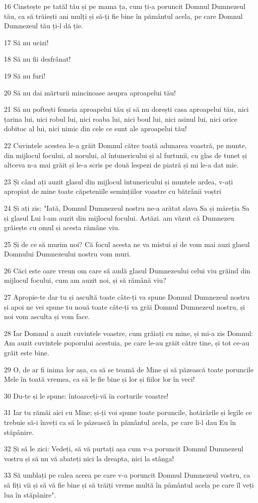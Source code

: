 \par 16 Cinstește pe tatăl tău și pe mama ța, cum ți-a poruncit Domnul Dumnezeul tău, ca să trăiești ani mulți și să-ți fie bine în pământul acela, pe care Domnul Dumnezeul tău ți-l dă ție.
\par 17 Să nu ucizi!
\par 18 Să nu fii desfrânat!
\par 19 Să nu furi!
\par 20 Să nu dai mărturii mincinoase asupra aproapelui tău!
\par 21 Să nu poftești femeia aproapelui tău și să nu dorești casa aproapelui tău, nici țarina lui, nici robul lui, nici roaba lui, nici boul lui, nici asinul lui, nici orice dobitoc al lui, nici nimic din cele ce sunt ale aproapelui tău!
\par 22 Cuvintele acestea le-a grăit Domnul către toată adunarea voastră, pe munte, din mijlocul focului, al norului, al întunericului și al furtunii, cu glas de tunet și altceva n-a mai grăit și le-a scris pe două lespezi de piatră și mi le-a dat mie.
\par 23 Și când ați auzit glasul din mijlocul întunericului și muntele ardea, v-ați apropiat de mine toate căpeteniile semințiilor voastre cu bătrânii voștri
\par 24 Și ați zis: "Iată, Domnul Dumnezeul nostru ne-a arătat slava Sa și măreția Sa și glasul Lui l-am auzit din mijlocul focului. Astăzi. am văzut că Dumnezeu grăiește cu omul și acesta rămâne viu.
\par 25 Și de ce să murim noi? Că focul acesta ne va mistui și de vom mai auzi glasul Domnului Dumnezeului nostru vom muri.
\par 26 Căci este oare vreun om care să audă glasul Dumnezeului celui viu grăind din mijlocul focului, cum am auzit noi, și să rămână viu?
\par 27 Apropie-te dar tu și ascultă toate câte-ți va spune Domnul Dumnezeul nostru și apoi ne vei spune tu nouă toate câte-ți va grăi Domnul Dumnezeul nostru, și noi vom asculta și vom face.
\par 28 Iar Domnul a auzit cuvintele voastre, cum grăiați cu mine, și mi-a zis Domnul: Am auzit cuvintele poporului acestuia, pe care le-au grăit către tine, și tot ce-au grăit este bine.
\par 29 O, de ar fi inima lor așa, ca să se teamă de Mine și să păzească toate poruncile Mele în toată vremea, ca să le fie bine și lor și fiilor lor în veci!
\par 30 Du-te și le spune: întoarceți-vă în corturile voastre!
\par 31 Iar tu rămâi aici cu Mine; și-ți voi spune toate poruncile, hotărârile și legile ce trebuie să-i înveți ca să le păzească în pământul acela, pe care li-l dau Eu în stăpânire.
\par 32 Și să le zici: Vedeți, să vă purtați așa cum v-a poruncit Domnul Dumnezeul vostru și să nu vă abateți nici la dreapta, nici la stânga!
\par 33 Să umblați pe calea aceea pe care v-a poruncit Domnul Dumnezeul vostru, ca să fiți vii și să vă fie bine și să trăiți vreme multă în pământul acela pe care îl veți lua în stăpânire".

